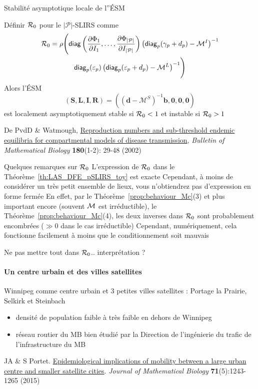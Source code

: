 \documentclass[aspectratio=169]{beamer}\usepackage[]{graphicx}\usepackage[]{xcolor}
\begin{document}
\begin{frame}{Stabilité asymptotique locale de l''ÉSM}
\begin{theorem}\label{th:LAS_DFE_pSLIRS_toy}
	Définir $\mathcal{R}_0$ pour le $|\mathcal{P}|$-SLIRS comme 
  \begin{multline*}
	\mathcal{R}_0=\rho\Biggl(
		\mathsf{diag}
		\left(
		\frac{\partial\Phi_1}{\partial I_1},\ldots,
		\frac{\partial\Phi_{|\mathcal{P}|}}{\partial I_{|\mathcal{P}|}}
		\right)
		\left(\mathsf{diag}_p(\gamma_p+d_p)-\mathcal{M}^I\right)^{-1}
		\\ 
		\mathsf{diag}_p(\varepsilon_p)
		\left(\mathsf{diag}_p(\varepsilon_p+d_p)-\mathcal{M}^L\right)^{-1} 
		\Biggr)			
  \end{multline*}
	Alors l'ÉSM
	$$
	(\mathbf{S},\mathbf{L},\mathbf{I},\mathbf{R})=\left((\mathbf{d}-\mathcal{M}^S)^{-1}\mathbf{b},\mathbf{0},\mathbf{0},\mathbf{0}\right)
	$$
	est localement asymptotiquement stable si $\mathcal{R}_0<1$ et instable si $\mathcal{R}_0>1$		
\end{theorem}
\vfill
{\tiny
De PvdD \& Watmough, \href{https://doi.org/10.1016/S0025-5564(02)00108-6}{Reproduction numbers and sub-threshold endemic equilibria for compartmental models of disease transmission}, \emph{Bulletin of Mathematical Biology} \textbf{180}(1-2): 29-48 (2002)}
\end{frame}

\begin{frame}{Quelques remarques sur $\mathcal{R}_0$}
	L'expression de $\mathcal{R}_0$ dans le Théorème~\ref{th:LAS_DFE_pSLIRS_toy} est exacte
	\vfill
	Cependant, à moins de considérer un très petit ensemble de lieux, vous n'obtiendrez pas d'expression en forme fermée
	\vfill
	En effet, par le Théorème~\ref{prop:behaviour_Mc}{(3)} et plus important encore (souvent $\mathcal{M}$ est irréductible), le Théorème~\ref{prop:behaviour_Mc}{(4)}, les deux inverses dans $\mathcal{R}_0$ sont probablement encombrées ($\gg 0$ dans le cas irréductible)
	\vfill
	Cependant, numériquement, cela fonctionne facilement à moins que le conditionnement soit mauvais
\end{frame}


\begin{frame}{Ne pas mettre tout dans $\mathcal{R}_0$.. interprétation ?}
\framesubtitle{Un centre urbain et des villes satellites}
Winnipeg comme centre urbain et 3 petites villes satellites : Portage la Prairie, Selkirk et Steinbach
\begin{itemize}
	\item densité de population faible à très faible en dehors de Winnipeg
	\item réseau routier du MB bien étudié par la Direction de l'ingénierie du trafic de l'infrastructure du MB
\end{itemize}
\vfill
JA \& S Portet. \href{https://julien-arino.github.io/assets/pdf/papers/2015_ArinoPortet-JMB71.pdf}{Epidemiological implications of mobility between a large urban centre and smaller satellite cities}. \emph{Journal of Mathematical Biology} \textbf{71}(5):1243-1265 (2015)
\end{frame}
\end{document}
